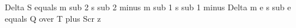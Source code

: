 Delta S equals m sub 2 s sub 2 minus m sub 1 s sub 1 minus Delta m e s sub e equals Q over T plus Scr z